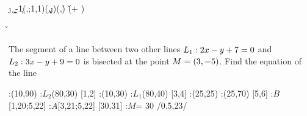 


\MULTIPLY{}\j
\MULTIPLY{}\k
\ADD\vbfive\vbsix\a
\SUBTRACT\a\k\b
\MULTIPLY\b{-1}\c
\SOLVELINEARSYSTEM(\vbthree,\vbfour;1,1)(\c,\j)(\g,\h)
\EXPR[0]\v{(\vbthree * \g + \vbfive)}
\EXPR[0]\w{(\vbfour * \h + \vbsix)}

\SUBTRACT\v\vbtwo\pp
\SUBTRACT\g\vbone\qq
\FRACTIONSIMPLIFY\pp\qq\p\q
\EXPR[0]{\acn}{(\q * \vbtwo - \p * \vbone)}

\question[4] The segment of a line between two other lines $L_1: 2 x - y + 7 = 0$ and $L_2: 3 x -y + 9 = 0$ 
is bisected at the point $M = (3, -5)$. Find the equation of the line


\watchout[-10pt]

\ifprintanswers
  \begin{marginfigure}[30pt]
      :(10,90)
      :$L_2$(80,30)
       [1,2]
      :(10,30)
      :$L_1$(80,40)
       [3,4]
      :(25,25)
      :(25,70)
       [5,6]
      :$B$[1,20;5,22]
      :$A$[3,21;5,22]
       [30,31]
      :$M$= 30 /0.5,23/
    \figdrawbegin{}
      \figdrawline [1,2]
      \figdrawline [3,4]
      \figdrawline [30,31]
    \figdrawend
    \centerline{\box\figBoxA}
  \end{marginfigure}
\fi 

